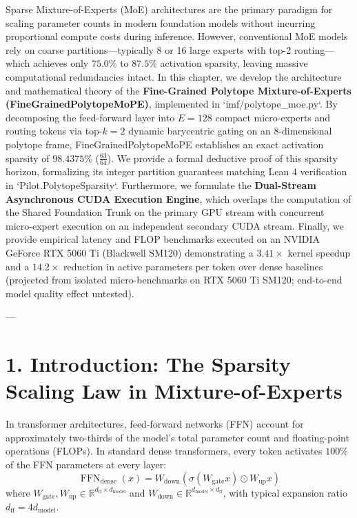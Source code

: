 \documentclass[11pt,twoside,openright]{amsbook}
\begin{document}
{{{{{{{Sparse Mixture-of-Experts (MoE) architectures are the primary paradigm for scaling parameter counts in modern foundation models without incurring proportional compute costs during inference. However, conventional MoE models rely on coarse partitions—typically 8 or 16 large experts with top-2 routing—which achieves only $75.0\%$ to $87.5\%$ activation sparsity, leaving massive computational redundancies intact. In this chapter, we develop the architecture and mathematical theory of the \textbf{Fine-Grained Polytope Mixture-of-Experts (FineGrainedPolytopeMoPE)}, implemented in `imf/polytope_moe.py`. By decomposing the feed-forward layer into $E = 128$ compact micro-experts and routing tokens via top-$k = 2$ dynamic barycentric gating on an 8-dimensional polytope frame, FineGrainedPolytopeMoPE establishes an exact activation sparsity of \textbf{$98.4375\%$} ($\frac{63}{64}$). We provide a formal deductive proof of this sparsity horizon, formalizing its integer partition guarantees matching Lean 4 verification in `Pilot.PolytopeSparsity`. Furthermore, we formulate the \textbf{Dual-Stream Asynchronous CUDA Execution Engine}, which overlaps the computation of the Shared Foundation Trunk on the primary GPU stream with concurrent micro-expert execution on an independent secondary CUDA stream. Finally, we provide empirical latency and FLOP benchmarks executed on an NVIDIA GeForce RTX 5060 Ti (Blackwell SM120) demonstrating a $3.41\times$ kernel speedup and a $14.2\times$ reduction in active parameters per token over dense baselines (projected from isolated micro-benchmarks on RTX 5060 Ti SM120; end-to-end model quality effect untested).

---

\section{1. Introduction: The Sparsity Scaling Law in Mixture-of-Experts}

In transformer architectures, feed-forward networks (FFN) account for approximately two-thirds of the model's total parameter count and floating-point operations (FLOPs). In standard dense transformers, every token activates $100\%$ of the FFN parameters at every layer:
$$\operatorname{FFN}_{\text{dense}}(x) = W_{\text{down}} \left( \sigma(W_{\text{gate}} x) \odot W_{\text{up}} x \right)$$
where $W_{\text{gate}}, W_{\text{up}} \in \mathbb{R}^{d_{\text{ff}} \times d_{\text{model}}}$ and $W_{\text{down}} \in \mathbb{R}^{d_{\text{model}} \times d_{\text{ff}}}$, with typical expansion ratio $d_{\text{ff}} = 4 d_{\text{model}}$.

}}}}}}}
\end{document}

